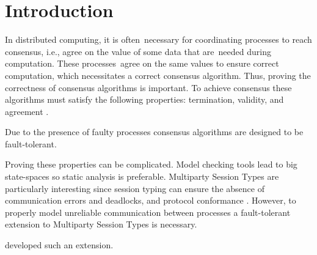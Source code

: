 \chapter{Introduction}

In distributed computing, it is often necessary for coordinating processes to reach consensus, i.e., agree on the value of some data that are needed during computation.
These processes agree on the same values to ensure correct computation, which necessitates a correct consensus algorithm.
Thus, proving the correctness of consensus algorithms is important.
To achieve consensus these algorithms must satisfy the following properties: termination, validity, and agreement \cite{dist_sys}.

Due to the presence of faulty processes consensus algorithms are designed to be fault-tolerant.

Proving these properties can be complicated.
Model checking tools lead to big state-spaces so static analysis is preferable.
Multiparty Session Types are particularly interesting since session typing can ensure the absence of communication errors and deadlocks, and protocol conformance \cite{mpstbd}.
However, to properly model unreliable communication between processes a fault-tolerant extension to Multiparty Session Types is necessary.

\citeauthor{ftmpst} developed such an extension.





